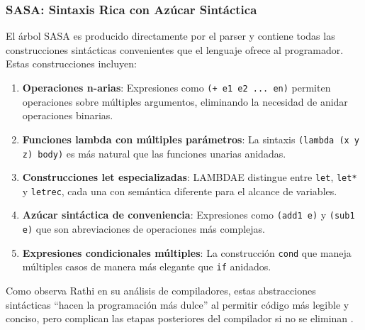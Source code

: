 \documentclass[a4paper,12pt]{article}
\begin{document}
\subsubsection{SASA: Sintaxis Rica con Azúcar Sintáctica}

El árbol SASA es producido directamente por el parser y contiene todas las construcciones sintácticas convenientes que el lenguaje ofrece al programador. Estas construcciones incluyen:

\begin{enumerate}
    \item \textbf{Operaciones n-arias}: Expresiones como \texttt{(+ e1 e2 ... en)} permiten operaciones sobre múltiples argumentos, eliminando la necesidad de anidar operaciones binarias.
    
    \item \textbf{Funciones lambda con múltiples parámetros}: La sintaxis \texttt{(lambda (x y z) body)} es más natural que las funciones unarias anidadas.
    
    \item \textbf{Construcciones let especializadas}: LAMBDAE distingue entre \texttt{let}, \texttt{let*} y \texttt{letrec}, cada una con semántica diferente para el alcance de variables.
    
    \item \textbf{Azúcar sintáctica de conveniencia}: Expresiones como \texttt{(add1 e)} y \texttt{(sub1 e)} que son abreviaciones de operaciones más complejas.
    
    \item \textbf{Expresiones condicionales múltiples}: La construcción \texttt{cond} que maneja múltiples casos de manera más elegante que \texttt{if} anidados.
\end{enumerate}

Como observa Rathi en su análisis de compiladores, estas abstracciones sintácticas ``hacen la programación más dulce'' al permitir código más legible y conciso, pero complican las etapas posteriores del compilador si no se eliminan \cite{Rathi2020}.
\end{document}
